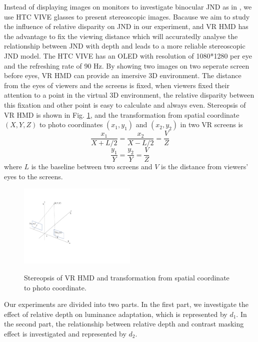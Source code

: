 \documentclass[journal]{IEEEtran}
\begin{document}
Instead of displaying images on monitors to investigate binocular JND as in \cite{RN637}, we use HTC VIVE glasses to present stereoscopic images. Bacause we aim to study the influence of relative disparity on JND in our experiment, and VR HMD has the advantage to fix the viewing distance which will accuratedly analyse the relationship between JND with depth and leads to a more reliable stereoscopic JND model. The HTC VIVE has an OLED with resolution of 1080*1280 per eye and the refreshing rate of 90 Hz. By showing two images on two seperate screen before eyes, VR HMD can provide an imersive 3D environment. The distance from the eyes of viewers and the screens is fixed, when viewers fixed their attention to a point in the virtual 3D environment, the relative disparity between this fixation and other point is easy to calculate and always even. Stereopsis of VR HMD is shown in Fig. \ref{fig:Stereopsis}, and the transformation from spatial coordinate $\left (X, Y, Z\right )$ to photo coordinates $\left (x_1, y_1\right )$ and $\left (x_2, y_2\right )$ in two VR screens is
\begin{equation}
\frac{x_1}{X+L/2}=\frac{x_2}{X-L/2}=\frac{V}{Z}
\end{equation}
\begin{equation}
\frac{y_1}{Y}=\frac{y_2}{Y}=\frac{V}{Z}
\end{equation}
where $L$ is the baseline between two screens and $V$ is the distance from viewers' eyes to the screens.
\begin{figure}[!t]
	\centering
	\includegraphics[width=0.5\textwidth]{axis_trans}\\
	\caption{Stereopsis of VR HMD and transformation from spatial coordinate to photo coordinate.}
	\label{fig:Stereopsis}
\end{figure}

Our experiments are divided into two parts. In the first part, we investigate the effect of relative depth on luminance adaptation, which is represented by $d_1$. In the second part, the relationship between relative depth and contrast masking effect is investigated and represented by $d_2$.
\end{document}
